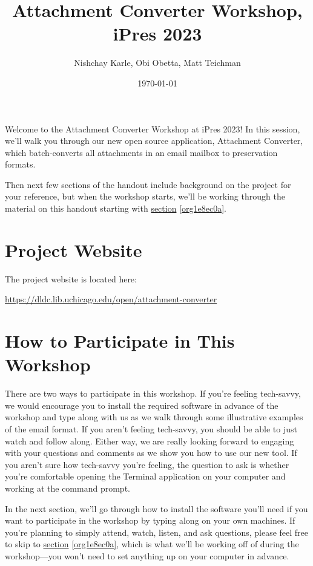 \documentclass[11pt]{article}
\author{Nishchay Karle, Obi Obetta, Matt Teichman}
\date{\today}
\title{Attachment Converter Workshop, iPres 2023}
\begin{document}
\maketitle
Welcome to the Attachment Converter Workshop at iPres 2023!  In this
session, we'll walk you through our new open source application,
Attachment Converter, which batch-converts all attachments in an email
mailbox to preservation formats.

Then next few sections of the handout include background on the
project for your reference, but when the workshop starts, we'll be
working through the material on this handout starting with \hyperref[org1e8ec0a]{section}
\ref{org1e8ec0a}.

\section{Project Website}
\label{sec:org4ee3ead}

The project website is located here:

\url{https://dldc.lib.uchicago.edu/open/attachment-converter}


\section{How to Participate in This Workshop}
\label{sec:org801c501}

There are two ways to participate in this workshop.  If you're feeling
tech-savvy, we would encourage you to install the required software in
advance of the workshop and type along with us as we walk through some
illustrative examples of the email format.  If you aren't feeling
tech-savvy, you should be able to just watch and follow along.  Either
way, we are really looking forward to engaging with your questions and
comments as we show you how to use our new tool. If you aren't sure
how tech-savvy you're feeling, the question to ask is whether you're
comfortable opening the Terminal application on your computer and
working at the command prompt.

In the next section, we'll go through how to install the software
you'll need if you want to participate in the workshop by typing along
on your own machines.  If you're planning to simply attend, watch,
listen, and ask questions, please feel free to skip to \hyperref[org1e8ec0a]{section}
\ref{org1e8ec0a}, which is what we'll be working off of during the
workshop---you won't need to set anything up on your computer in
advance.
\end{document}
